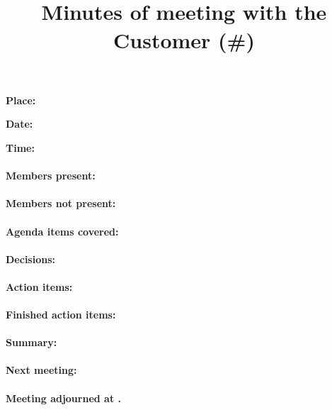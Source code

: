 \documentclass[paper=a4, fontsize=11pt]{article} %
\title{
\horrule{0.5pt} \\[0.4cm] %
\huge Minutes of meeting with the Customer (\#\meetingNumber)
\horrule{2pt} \\[-0.9cm] %
}
\newcounter{foocounter}
\begin{document}
\date{}
\maketitle %
\textbf{Place:} \meetingPlace

\textbf{Date:}  \meetingDate

\textbf{Time:}  \meetingTime

\paragraph{Members present:} \membersPresent
\paragraph{Members not present:} \membersMissing
\paragraph{Agenda items covered:} \hspace{0pt}
\setcounter{foocounter}{0}

\paragraph{Decisions:} \hspace{0pt}
\setcounter{foocounter}{0}

\paragraph{Action items:} \hspace{0pt}
\setcounter{foocounter}{0}

\paragraph{Finished action items:} \hspace{0pt}
\setcounter{foocounter}{0}

\paragraph{Summary:} \summary

\paragraph{Next meeting:} \nextMeeting

\paragraph{Meeting adjourned at \meetingEnd.}
\end{document}
